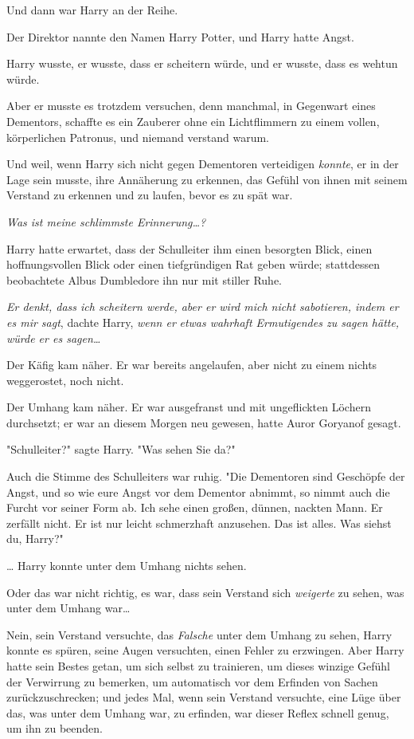{Und dann war Harry an der Reihe.

Der Direktor nannte den Namen Harry Potter, und Harry hatte Angst.

Harry wusste, er wusste, dass er scheitern würde, und er wusste, dass es wehtun würde.

Aber er musste es trotzdem versuchen, denn manchmal, in Gegenwart eines Dementors, schaffte es ein Zauberer ohne ein Lichtflimmern zu einem vollen, körperlichen Patronus, und niemand verstand warum.

Und weil, wenn Harry sich nicht gegen Dementoren verteidigen \emph{konnte}, er in der Lage sein musste, ihre Annäherung zu erkennen, das Gefühl von ihnen mit seinem Verstand zu erkennen und zu laufen, bevor es zu spät war.

\emph{Was ist meine schlimmste Erinnerung…?}

Harry hatte erwartet, dass der Schulleiter ihm einen besorgten Blick, einen hoffnungsvollen Blick oder einen tiefgründigen Rat geben würde; stattdessen beobachtete Albus Dumbledore ihn nur mit stiller Ruhe.

\emph{Er denkt, dass ich scheitern werde, aber er wird mich nicht sabotieren, indem er es mir sagt}, dachte Harry, \emph{wenn er} \emph{etwas wahrhaft Ermutigendes zu sagen hätte, würde er es sagen…}

Der Käfig kam näher. Er war bereits angelaufen, aber nicht zu einem nichts weggerostet, noch nicht.

Der Umhang kam näher. Er war ausgefranst und mit ungeflickten Löchern durchsetzt; er war an diesem Morgen neu gewesen, hatte Auror Goryanof gesagt.

"Schulleiter?" sagte Harry. "Was sehen Sie da?"

Auch die Stimme des Schulleiters war ruhig. "Die Dementoren sind Geschöpfe der Angst, und so wie eure Angst vor dem Dementor abnimmt, so nimmt auch die Furcht vor seiner Form ab. Ich sehe einen großen, dünnen, nackten Mann. Er zerfällt nicht. Er ist nur leicht schmerzhaft anzusehen. Das ist alles. Was siehst du, Harry?"

… Harry konnte unter dem Umhang nichts sehen.

Oder das war nicht richtig, es war, dass sein Verstand sich \emph{weigerte} zu sehen, was unter dem Umhang war…

Nein, sein Verstand versuchte, das \emph{Falsche} unter dem Umhang zu sehen, Harry konnte es spüren, seine Augen versuchten, einen Fehler zu erzwingen. Aber Harry hatte sein Bestes getan, um sich selbst zu trainieren, um dieses winzige Gefühl der Verwirrung zu bemerken, um automatisch vor dem Erfinden von Sachen zurückzuschrecken; und jedes Mal, wenn sein Verstand versuchte, eine Lüge über das, was unter dem Umhang war, zu erfinden, war dieser Reflex schnell genug, um ihn zu beenden.

}
